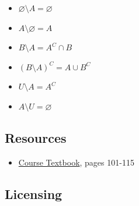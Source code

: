 \begin{itemize}
    \item $\varnothing \setminus A = \varnothing$
\end{itemize}

\begin{itemize}
    \item $A \setminus \varnothing = A$
\end{itemize}

\begin{itemize}
    \item $B \setminus A = A^C \cap B$
\end{itemize}

\begin{itemize}
    \item $(B \setminus A)^C = A \cup B^C$
\end{itemize}

\begin{itemize}
    \item $U \setminus A = A^C$
\end{itemize}

\begin{itemize}
    \item $A \setminus U = \varnothing$
\end{itemize}


\subsection{Resources}
\label{sss:reso-55b5}




\begin{itemize}
    \item \href{https://link-springer-com.libweb.lib.utsa.edu/content/pdf/10.1007\%2F978-1-4419-7127-2.pdf}{Course Textbook}, pages 101-115
\end{itemize}


\subsection{Licensing}
\label{sss:lice-7352}




